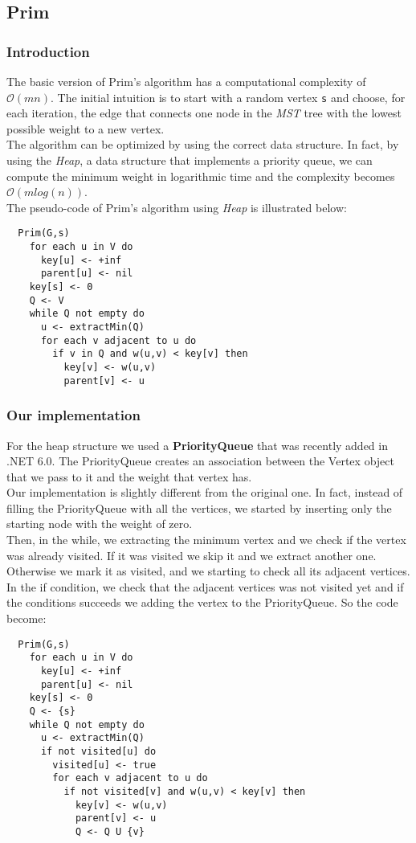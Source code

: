 \subsection{Prim}
\subsubsection{Introduction}
The basic version of Prim's algorithm has a computational complexity of $\mathcal{O}(mn)$.
The initial intuition is to start with a random vertex \verb|s| and choose, for each iteration, the edge 
that connects one node in the \textit{MST} tree with the lowest possible weight to a new vertex.\\
The algorithm can be optimized by using the correct data structure.
In fact, by using the \textit{Heap}, a data structure that implements a priority queue, we can compute the 
minimum weight in logarithmic time and the complexity becomes $\mathcal{O}(mlog(n))$. \\

\noindent
The pseudo-code of Prim's algorithm using \textit{Heap} is illustrated below:
\begin{verbatim}
  Prim(G,s)
    for each u in V do
      key[u] <- +inf
      parent[u] <- nil
    key[s] <- 0
    Q <- V
    while Q not empty do
      u <- extractMin(Q)
      for each v adjacent to u do
        if v in Q and w(u,v) < key[v] then
          key[v] <- w(u,v)
          parent[v] <- u
\end{verbatim}

\subsubsection{Our implementation}
For the heap structure we used a \textbf{PriorityQueue} that was recently added in .NET 6.0.
The PriorityQueue creates an association between the Vertex object that we pass to it and the weight that vertex has.\\
Our implementation is slightly different from the original one. In fact, instead of filling the PriorityQueue with 
all the vertices, we started by inserting only the starting node with the weight of zero.\\
Then, in the while, we extracting the minimum vertex and we check if the vertex was already visited.
If it was visited we skip it and we extract another one.
Otherwise we mark it as visited, and we starting to check all its adjacent vertices.
In the if condition, we check that the adjacent vertices was not visited yet and if the conditions succeeds 
we adding the vertex to the PriorityQueue.
So the code become:
\begin{verbatim}
  Prim(G,s)
    for each u in V do
      key[u] <- +inf
      parent[u] <- nil
    key[s] <- 0
    Q <- {s}
    while Q not empty do
      u <- extractMin(Q)
      if not visited[u] do
        visited[u] <- true
        for each v adjacent to u do
          if not visited[v] and w(u,v) < key[v] then
            key[v] <- w(u,v)
            parent[v] <- u
            Q <- Q U {v}
\end{verbatim}

